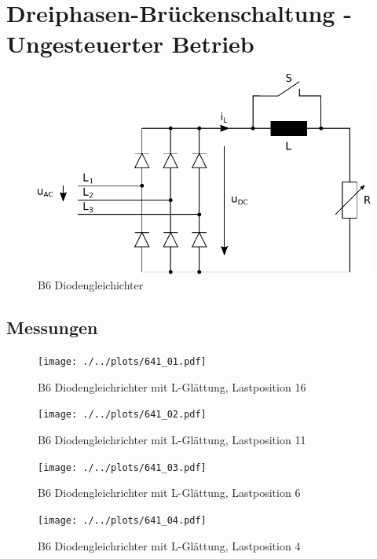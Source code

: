 \section{Dreiphasen-Brückenschaltung - Ungesteuerter Betrieb}

\begin{figure}[h!]
    \centering
    \includegraphics[scale=\sscale]{./../fig/b6_diode.pdf}
    \caption{B6 Diodengleichichter}
    \label{fig:b6_diode}
\end{figure}

\subsection{Messungen}

\begin{figure}[h!]
    \centering
    \texttt{[image: ./../plots/641\_01.pdf]}
    \caption{B6 Diodengleichrichter mit L-Glättung, Lastposition 16}
    \label{fig:b2_diode_l16}
\end{figure}

\begin{figure}[h!]
    \centering
    \texttt{[image: ./../plots/641\_02.pdf]}
    \caption{B6 Diodengleichrichter mit L-Glättung, Lastposition 11}
    \label{fig:b2_diode_l11}
\end{figure}

\begin{figure}[h!]
    \centering
    \texttt{[image: ./../plots/641\_03.pdf]}
    \caption{B6 Diodengleichrichter mit L-Glättung, Lastposition 6}
    \label{fig:b2_diode_l6}
\end{figure}

\begin{figure}[h!]
    \centering
    \texttt{[image: ./../plots/641\_04.pdf]}
    \caption{B6 Diodengleichrichter mit L-Glättung, Lastposition 4}
    \label{fig:b2_diode_l16}
\end{figure}

\clearpage
